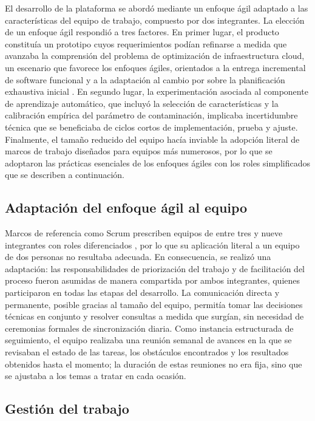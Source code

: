 El desarrollo de la plataforma se abordó mediante un enfoque ágil adaptado a las características del equipo de trabajo, compuesto por dos integrantes. La elección de un enfoque ágil respondió a tres factores. En primer lugar, el producto constituía un prototipo cuyos requerimientos podían refinarse a medida que avanzaba la comprensión del problema de optimización de infraestructura cloud, un escenario que favorece los enfoques ágiles, orientados a la entrega incremental de software funcional y a la adaptación al cambio por sobre la planificación exhaustiva inicial \parencite{AgileManifesto2001}. En segundo lugar, la experimentación asociada al componente de aprendizaje automático, que incluyó la selección de características y la calibración empírica del parámetro de contaminación, implicaba incertidumbre técnica que se beneficiaba de ciclos cortos de implementación, prueba y ajuste. Finalmente, el tamaño reducido del equipo hacía inviable la adopción literal de marcos de trabajo diseñados para equipos más numerosos, por lo que se adoptaron las prácticas esenciales de los enfoques ágiles con los roles simplificados que se describen a continuación.

\subsection{Adaptación del enfoque ágil al equipo}

Marcos de referencia como Scrum prescriben equipos de entre tres y nueve integrantes con roles diferenciados \parencite{ScrumGuide2020}, por lo que su aplicación literal a un equipo de dos personas no resultaba adecuada. En consecuencia, se realizó una adaptación: las responsabilidades de priorización del trabajo y de facilitación del proceso fueron asumidas de manera compartida por ambos integrantes, quienes participaron en todas las etapas del desarrollo. La comunicación directa y permanente, posible gracias al tamaño del equipo, permitía tomar las decisiones técnicas en conjunto y resolver consultas a medida que surgían, sin necesidad de ceremonias formales de sincronización diaria. Como instancia estructurada de seguimiento, el equipo realizaba una reunión semanal de avances en la que se revisaban el estado de las tareas, los obstáculos encontrados y los resultados obtenidos hasta el momento; la duración de estas reuniones no era fija, sino que se ajustaba a los temas a tratar en cada ocasión.

\subsection{Gestión del trabajo}


